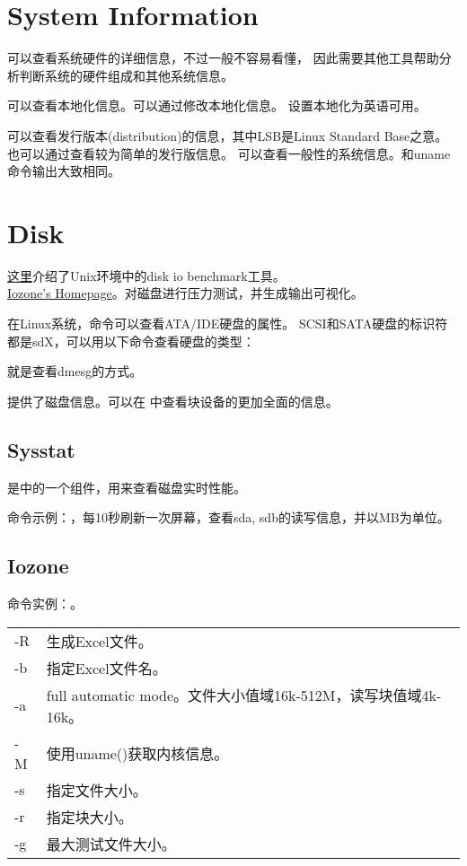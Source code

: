\section{System Information}
可以查看系统硬件的详细信息，不过一般不容易看懂，
因此需要其他工具帮助分析判断系统的硬件组成和其他系统信息。

可以查看本地化信息。可以通过修改本地化信息。
设置本地化为英语可用。

可以查看发行版本(distribution)的信息，其中LSB是Linux Standard Base之意。
也可以通过查看较为简单的发行版信息。
可以查看一般性的系统信息。和uname命令输出大致相同。

\section{Disk}
\href{http://www.acnc.com/04_02_01.html}{这里}介绍了Unix环境中的disk io benchmark工具。\\
\href{http://www.iozone.org/}{Iozone's Homepage}。对磁盘进行压力测试，并生成输出可视化。

在Linux系统，命令可以查看ATA/IDE硬盘的属性。
SCSI和SATA硬盘的标识符都是sdX，可以用以下命令查看硬盘的类型：

就是查看dmesg的方式。

提供了磁盘信息。可以在
中查看块设备的更加全面的信息。

\subsection{Sysstat}
是中的一个组件，用来查看磁盘实时性能。

命令示例：，每10秒刷新一次屏幕，查看sda, sdb的读写信息，并以MB为单位。

\subsection{Iozone}
命令实例：。

\begin{table}
\centering
\begin{tabularx}{\textwidth}{lX}
-R      & 生成Excel文件。\\
-b      & 指定Excel文件名。\\
-a      & full automatic mode。文件大小值域16k-512M，读写块值域4k-16k。\\
-M      & 使用uname()获取内核信息。\\
-s      & 指定文件大小。\\
-r      & 指定块大小。\\
-g      & 最大测试文件大小。\\
\end{tabularx}
\end{table}


